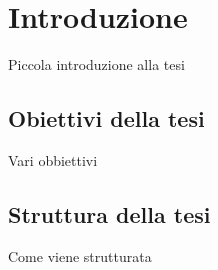 \chapter*{Introduzione}
Piccola introduzione alla tesi

\section{Obiettivi della tesi}
Vari obbiettivi

\section{Struttura della tesi}
Come viene strutturata
